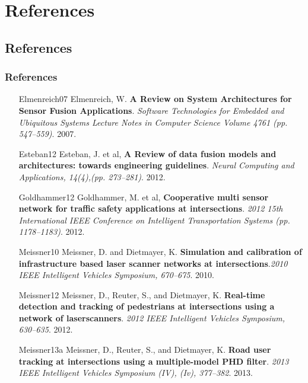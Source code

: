 \documentclass[table]{beamer}
\begin{document}
\section{References}
\subsection{References}
\frame
{
	\frametitle{References}
	\footnotesize{	
	\begin{itemize}[leftmargin=.6in]
		\item [Elmenreich07] Elmenreich, W. \textbf{A Review on System Architectures for Sensor Fusion Applications}. \textit{Software Technologies for Embedded and Ubiquitous Systems
Lecture Notes in Computer Science Volume 4761 (pp. 547–559)}. 2007.
		\item [Esteban12] Esteban, J. et al, \textbf{A Review of data fusion models and architectures: towards 	engineering guidelines}. \textit{Neural Computing and Applications, 14(4),(pp. 273–281)}. 2012.
		\item [Goldhammer12] Goldhammer, M. et al, \textbf{Cooperative multi sensor network for traffic safety applications at intersections}. \textit{2012 15th International IEEE Conference on Intelligent Transportation Systems (pp. 1178–1183)}. 2012.
	    \item [Meissner10] Meissner, D. and Dietmayer, K. \textbf{Simulation and calibration of infrastructure based laser scanner networks at intersections}.\textit{2010 IEEE Intelligent Vehicles Symposium, 670–675}. 2010.
	    \item [Meissner12] Meissner, D., Reuter, S., and Dietmayer, K. \textbf{Real-time detection and tracking of pedestrians at intersections using a network of laserscanners}. \textit{2012 IEEE Intelligent Vehicles Symposium, 630–635}. 2012.
	    \item [Meissner13a] Meissner, D., Reuter, S., and Dietmayer, K. \textbf{Road user tracking at intersections using a multiple-model PHD filter}. \textit{2013 IEEE Intelligent Vehicles Symposium (IV), (Iv), 377–382}. 2013.
		
		
	\end{itemize}
	}
}
\end{document}
